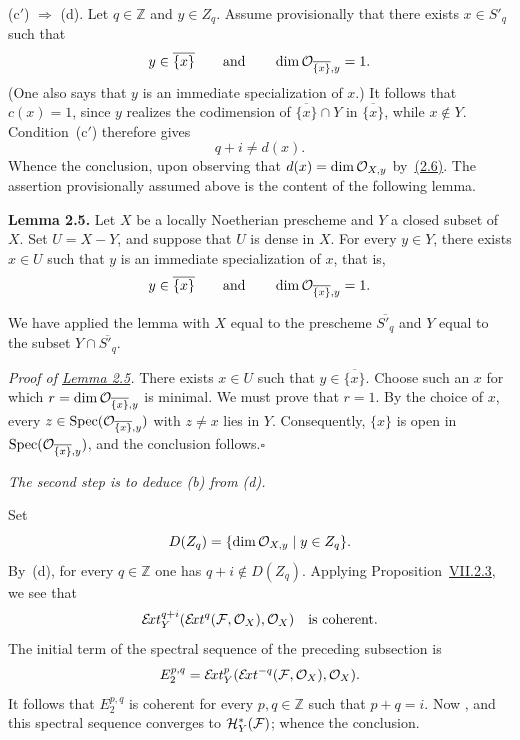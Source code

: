 \smallskip
\noindent\textup{(c$'$)} $\Rightarrow$ \textup{(d)}. Let $q\in\mathbb Z$
and $y\in Z_q$. Assume provisionally that there exists $x\in S'_q$ such
that
\[
  y\in\overline{\{x\}}\qquad\text{and}\qquad
  \dim\mathcal O_{\overline{\{x\}},y}=1.
\]
(One also says that $y$ is an immediate specialization of $x$.) It follows
that $c(x)=1$, since $y$ realizes the codimension of
$\overline{\{x\}}\cap Y$ in $\overline{\{x\}}$, while $x\notin Y$.
Condition~\textup{(c$'$)} therefore gives
\[
  q+i\ne d(x).
\]
Whence the conclusion, upon observing that $d(x)=\dim\mathcal O_{X,y}$ by~\hyperref[eq:VIII.2.6]{(2.6)}.
The assertion provisionally assumed above is the content of the following
lemma.

\medskip
{}\noindent\textbf{Lemma 2.5.} Let $X$ be a locally Noetherian prescheme and
$Y$ a closed subset of $X$. Set $U=X-Y$, and suppose that $U$ is dense in
$X$. For every $y\in Y$, there exists $x\in U$ such that $y$ is an immediate
specialization of $x$, that is,
\[
  y\in\overline{\{x\}}\qquad\text{and}\qquad
  \dim\mathcal O_{\overline{\{x\}},y}=1.
\]

We have applied the lemma with $X$ equal to the prescheme
$\overline{S'_q}$ and $Y$ equal to the subset
$Y\cap\overline{S'_q}$.

\medskip
\noindent\textit{Proof of \hyperref[VIII.2.5]{Lemma 2.5}.} There exists $x\in U$ such that
$y\in\overline{\{x\}}$. Choose such an $x$ for which
$r=\dim\mathcal O_{\overline{\{x\}},y}$ is minimal. We must prove that $r=1$.
By the choice of $x$, every
$z\in\operatorname{Spec}(\mathcal O_{\overline{\{x\}},y})$ with $z\ne x$ lies in $Y$.
Consequently, $\{x\}$ is open in
$\operatorname{Spec}(\mathcal O_{\overline{\{x\}},y})$, and the conclusion follows.\hfill$\square$


\medskip
\noindent\textit{The second step is to deduce \textup{(b)} from
\textup{(d)}.}

\medskip
Set
\[
  D(Z_q)=\{\dim\mathcal O_{X,y}\mid y\in Z_q\}.
\]
By~\textup{(d)}, for every $q\in\mathbb Z$ one has
$q+i\notin D(Z_q)$. Applying Proposition~\hyperref[VII.2.3]{VII.2.3}, we see that
\[
  \sExt_Y^{q+i}(\sExt^q(\cF,\cO_X),\cO_X)
  \quad\text{is coherent.}
\]
The initial term of the spectral sequence of the preceding subsection is
\[
  E_2^{p,q}
  =\sExt_Y^p(\sExt^{-q}(\cF,\cO_X),\cO_X).
\]
It follows that $E_2^{p,q}$ is coherent for every $p,q\in\mathbb Z$ such
that $p+q=i$. Now , and this spectral
sequence converges to $\sH_Y^\ast(\cF)$; whence the conclusion.


